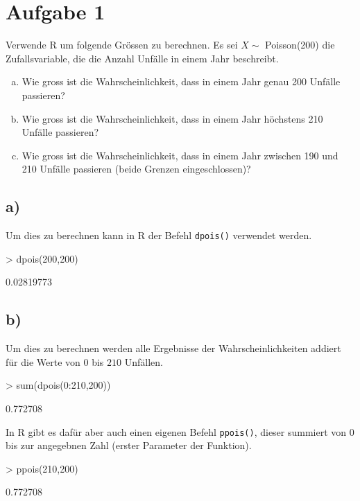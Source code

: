 \section{Aufgabe 1}
Verwende R um folgende Grössen zu berechnen. Es sei $X \sim$ Poisson(200) die
Zufallsvariable, die die Anzahl Unfälle in einem Jahr beschreibt.

\begin{enumerate}[(a)]
	\item Wie gross ist die Wahrscheinlichkeit, dass in einem Jahr genau
          200 Unfälle passieren?
	\item Wie gross ist die Wahrscheinlichkeit, dass in einem Jahr höchstens
          210 Unfälle passieren?
    \item Wie gross ist die Wahrscheinlichkeit, dass in einem Jahr zwischen
          190 und 210 Unfälle passieren (beide Grenzen eingeschlossen)?
\end{enumerate}

\subsection*{a)}
Um dies zu berechnen kann in R der Befehl \verb!dpois()! verwendet werden.
\begin{Schunk}
\begin{Sinput}
> dpois(200,200)
\end{Sinput}
\begin{Soutput}
[1] 0.02819773
\end{Soutput}
\end{Schunk}

\subsection*{b)}
Um dies zu berechnen werden alle Ergebnisse der Wahrscheinlichkeiten addiert
für die Werte von $0$ bis $210$ Unfällen.
\begin{Schunk}
\begin{Sinput}
> sum(dpois(0:210,200))
\end{Sinput}
\begin{Soutput}
[1] 0.772708
\end{Soutput}
\end{Schunk}
In R gibt es dafür aber auch einen eigenen Befehl \verb!ppois()!, dieser
summiert von $0$ bis zur angegebnen Zahl (erster Parameter der Funktion).
\begin{Schunk}
\begin{Sinput}
> ppois(210,200)
\end{Sinput}
\begin{Soutput}
[1] 0.772708
\end{Soutput}
\end{Schunk}

